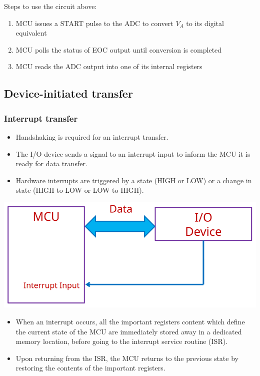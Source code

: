 \documentclass[11pt]{article}
\begin{document}
Steps to use the circuit above:
\begin{enumerate}
\item MCU issues a START pulse to the ADC to convert \(V_A\) to its digital equivalent
\item MCU polls the status of EOC output until conversion is completed
\item MCU reads the ADC output into one of its internal registers
\end{enumerate}

\subsection{Device-initiated transfer}
\label{sec:orge512d95}

\subsubsection{Interrupt transfer}
\label{sec:org399d2c5}
\begin{itemize}
\item Handshaking is required for an interrupt transfer.
\item The I/O device sends a signal to an interrupt input to inform the MCU it is ready for data transfer.
\item Hardware interrupts are triggered by a state (HIGH or LOW) or a change in state (HIGH to LOW or LOW to HIGH).
\end{itemize}

\begin{center}
\includegraphics[width=.9\linewidth]{./images/interrupt-transfer-diagram.png}
\end{center}

\begin{itemize}
\item When an interrupt occurs, all the important registers content which define the current state of the MCU are immediately stored away in a dedicated memory location, before going to the interrupt service routine (ISR).
\item Upon returning from the ISR, the MCU returns to the previous state by restoring the contents of the important registers.
\end{itemize}
\end{document}
